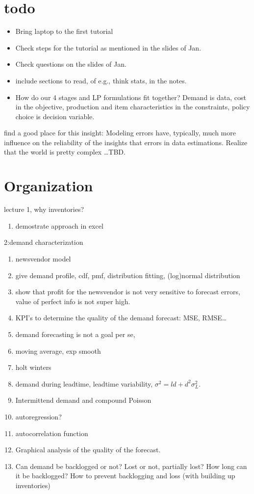 
\section{todo}
\label{sec:todo}

\begin{itemize}
\item Bring laptop to the first tutorial
\item Check steps for the tutorial as mentioned in the slides of Jan.
\item Check questions on the slides of Jan.
\item include sections to read, of e.g., think stats, in the notes.
\item How do our 4 stages and LP formulations fit together? Demand is
  data, cost in the objective, production and item characteristics in
  the constraints, policy choice is decision variable.
\end{itemize}


find a good place for this insight: Modeling errors have, typically, much more influence on the
reliability of the insights that errors in data estimations. Realize
that the world is pretty complex \ldots TBD.


\section{Organization}
\label{sec:organization}


lecture 1, why inventories?

\begin{enumerate}
\item demostrate approach in excel
\end{enumerate}

2:demand characterization
\begin{enumerate}
\item newsvendor model
\item give demand profile, cdf, pmf, distribution fitting, (log)normal distribution
\item show that profit for the newsvendor is not very sensitive to
  forecast errors, value of perfect info is not super high. 
\item KPI's to determine the quality of the demand forecast: MSE, RMSE\ldots
\item demand forecasting is not a goal per se,
\item moving average, exp smooth
\item holt winters
\item demand during leadtime, leadtime variability, $\sigma^2 = l d + d^2 \sigma_L^2$.
\item Intermittend demand and compound Poisson
\item autoregression?
\item autocorrelation function
\item Graphical analysis of the quality of the forecast.
\item Can demand be backlogged or not? Lost or not, partially lost?
  How long can it be backlogged? How to prevent backlogging and loss
  (with building up inventories)
\end{enumerate}


